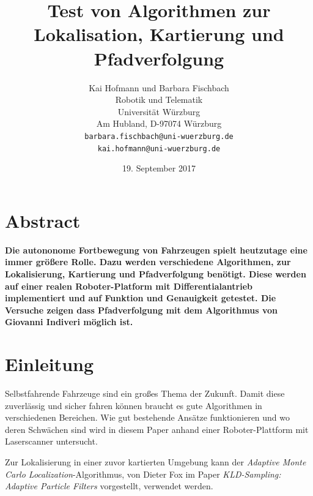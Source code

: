 \documentclass[11pt,a4paper]{article}
\begin{document}
\sloppy

\title{\Large\bf Test von Algorithmen zur Lokalisation, Kartierung und Pfadverfolgung }

\author{Kai Hofmann und Barbara Fischbach\\
  Robotik und Telematik \\
  Universit\"at W\"urzburg\\
  Am Hubland, D-97074 W\"urzburg\\
{\small \texttt{barbara.fischbach@uni-wuerzburg.de}}\\
{\small \texttt{kai.hofmann@uni-wuerzburg.de}}}

\date{19. September 2017}



\maketitle


\newpage

\twocolumn

\section*{Abstract}


	\textbf{Die autononome Fortbewegung von Fahrzeugen spielt heutzutage eine immer gr\"o\ss{}ere Rolle. Dazu werden verschiedene Algorithmen, zur Lokalisierung, Kartierung und Pfadverfolgung ben\"otigt. Diese werden auf einer realen Roboter-Platform mit Differentialantrieb implementiert und auf Funktion und Genauigkeit getestet. Die Versuche zeigen dass Pfadverfolgung mit dem Algorithmus von Giovanni Indiveri m\"oglich ist. }

\section{Einleitung}
	Selbstfahrende Fahrzeuge sind ein gro{\ss}es Thema der Zukunft. Damit diese zuverl\"assig und sicher fahren k\"onnen braucht es gute Algorithmen in verschiedenen Bereichen. Wie gut bestehende Ans\"atze funktionieren und wo deren Schw\"achen sind wird in diesem Paper anhand einer Roboter-Plattform mit Laserscanner untersucht. 

	Zur Lokalisierung in einer zuvor kartierten Umgebung kann der \textit{Adaptive Monte Carlo Localization}-Algorithmus, von Dieter Fox im Paper \textit{KLD-Sampling: Adaptive Particle Filters} \cite{amclPaper} vorgestellt, verwendet werden. 
	
\end{document}
